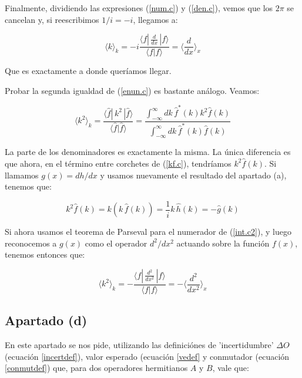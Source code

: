 Finalmente, dividiendo las expresiones (\ref{num.c}) y (\ref{den.c}), vemos que los $2\pi$ se cancelan y, si reescribimos $1/i=-i$, llegamos a:

\begin{equation}
    \langle k \rangle_k = -i \frac{\langle f|\,\frac{d}{dx}\,|f\rangle}{\langle f|f\rangle}=\langle \frac{d}{dx}\rangle_x
\end{equation}

Que es exactamente a donde queríamos llegar.

Probar la segunda igualdad de (\ref{enun.c}) es bastante análogo. Veamos:

\begin{equation}\label{int.c2}
    \langle k^2 \rangle_k= \frac{\langle \hat{f} |\,k^2\,|\hat{f}\rangle}{\langle \hat{f}|\hat{f}\rangle}=\frac{\int_{-\infty}^{\infty}dk\,\hat{f}^*(k) k^2 \hat{f}(k)}{\int_{-\infty}^{\infty}dk \,\hat{f}^*(k) \hat{f}(k)}
\end{equation}

La parte de los denominadores es exactamente la misma. La única diferencia es que ahora, en el término entre corchetes de (\ref{kf.c}), tendríamos $k^2 \hat{f}(k)$. Si llamamos $g(x)=dh/dx$ y usamos nuevamente el resultado del apartado (a), tenemos que:

\begin{equation}
    k^2 \hat{f}(k)=k(k\,\hat{f}(k))=\frac{1}{i}k\,\hat{h}(k)=-\hat{g}(k)
\end{equation}

Si ahora usamos el teorema de Parseval para el numerador de (\ref{int.c2}), y luego reconocemos a $g(x)$ como el operador $d^2/dx^2$ actuando sobre la función $f(x)$, tenemos entonces que:

\begin{equation}
     \langle k^2 \rangle_k =-\frac{\langle f|\,\frac{d^2}{dx^2}\,|f\rangle}{\langle f|f\rangle}=-\langle \frac{d^2}{dx^2}\rangle_x
\end{equation}


\subsection{\textbf{Apartado (d)}}

En este apartado se nos pide, utilizando las definiciónes de 'incertidumbre' $\Delta O$ (ecuación \ref{incertdef}), valor esperado (ecuación \ref{vedef} y conmutador (ecuación \ref{conmutdef}) que, para dos operadores hermitianos $A$ y $B$, vale que:

